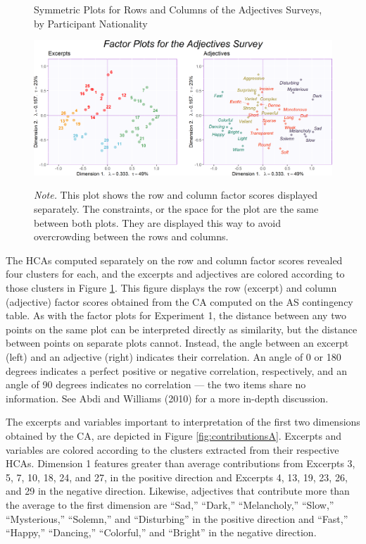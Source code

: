 \documentclass[
  english,
  man,floatsintext]{apa6}
\begin{document}
\begin{figure}   
  \centering  
  \caption{Symmetric Plots for Rows and Columns of the Adjectives Surveys, by Participant Nationality}
    \includegraphics{./Music-Descriptor-Space_files/figure-latex/factormapsA-1.png}
  \label{fig:factormapsA}
  \caption*{\footnotesize \textit{Note.}  This plot shows the row and column factor scores displayed separately. The constraints, or the space for the plot are the same between both plots. They are displayed this way to avoid overcrowding between the rows and columns.}
\end{figure}

The HCAs computed separately on the row and column factor scores revealed four clusters for each, and the excerpts and adjectives are colored according to those clusters in Figure \ref{fig:factormapsA}. This figure displays the row (excerpt) and column (adjective) factor scores obtained from the CA computed on the AS contingency table. As with the factor plots for Experiment 1, the distance between any two points on the same plot can be interpreted directly as similarity, but the distance between points on separate plots cannot. Instead, the angle between an excerpt (left) and an adjective (right) indicates their correlation. An angle of 0 or 180 degrees indicates a perfect positive or negative correlation, respectively, and an angle of 90 degrees indicates no correlation --- the two items share no information. See Abdi and Williams (2010) for a more in-depth discussion.

The excerpts and variables important to interpretation of the first two dimensions obtained by the CA, are depicted in Figure \ref{fig:contributionsA}. Excerpts and variables are colored according to the clusters extracted from their respective HCAs. Dimension 1 features greater than average contributions from Excerpts 3, 5, 7, 10, 18, 24, and 27, in the positive direction and Excerpts 4, 13, 19, 23, 26, and 29 in the negative direction. Likewise, adjectives that contribute more than the average to the first dimension are ``Sad,'' ``Dark,'' ``Melancholy,'' ``Slow,'' ``Mysterious,'' ``Solemn,'' and ``Disturbing'' in the positive direction and ``Fast,'' ``Happy,'' ``Dancing,'' ``Colorful,'' and ``Bright'' in the negative direction.
\end{document}
